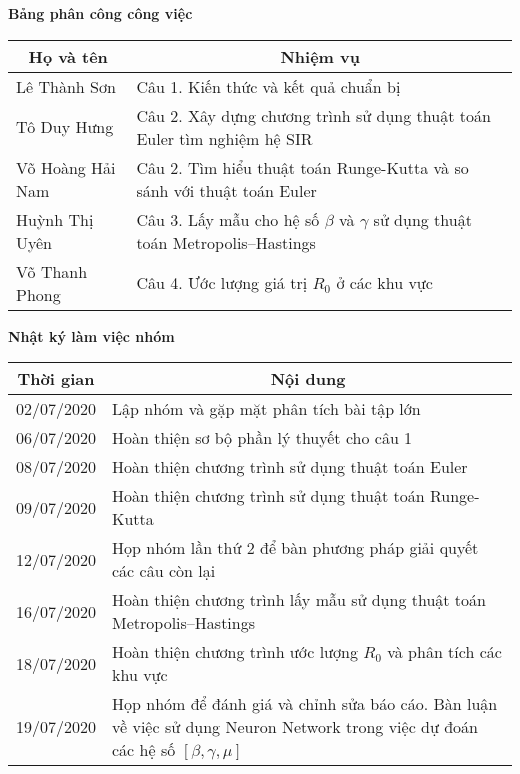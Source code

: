 \documentclass[a4paper]{article}
\begin{document}
\newpage
\textbf{\large Bảng phân công công việc}
\vspace{0.5cm}
\begin{table}[!h]
    \centering
    \begin{tabular}{|p{3cm}|p{10cm}|}
        \hline
        \multicolumn{1}{|c|}{Họ và tên} & \multicolumn{1}{c|}{Nhiệm vụ} \\
         \hline
         Lê Thành Sơn & Câu 1. Kiến thức và kết quả chuẩn bị\\ 
         \hline
         Tô Duy Hưng &  Câu 2. Xây dựng chương trình sử dụng thuật toán Euler tìm nghiệm hệ SIR\\
         \hline
         Võ Hoàng Hải Nam & Câu 2. Tìm hiểu thuật toán Runge-Kutta và so sánh với thuật toán Euler\\
         \hline 
         Huỳnh Thị Uyên & Câu 3. Lấy mẫu cho hệ số $\beta$ và $\gamma$ sử dụng thuật toán Metropolis–Hastings\\
         \hline 
         Võ Thanh Phong & Câu 4. Ước lượng giá trị $R_0$ ở các khu vực\\
         \hline
    \end{tabular}
\end{table}

\vspace{0.5cm}
\textbf{\large Nhật ký làm việc nhóm}
\vspace{0.5cm}
\begin{table}[!h]
    \centering
    \begin{tabular}{|p{3cm}|p{10cm}|}
        \hline
        \multicolumn{1}{|c|}{Thời gian } & \multicolumn{1}{c|}{Nội dung} \\
         \hline
         02/07/2020 & Lập nhóm và gặp mặt phân tích bài tập lớn \\ 
         \hline
         06/07/2020 &  Hoàn thiện sơ bộ phần lý thuyết cho câu 1\\
         \hline
         08/07/2020 & Hoàn thiện chương trình sử dụng thuật toán Euler\\
         \hline 
         09/07/2020 & Hoàn thiện chương trình sử dụng thuật toán Runge-Kutta\\
         \hline 
         12/07/2020 & Họp nhóm lần thứ 2 để bàn phương pháp giải quyết các câu còn lại\\
         \hline
         16/07/2020 & Hoàn thiện chương trình lấy mẫu sử dụng thuật toán Metropolis–Hastings\\
         \hline 
         18/07/2020 & Hoàn thiện chương trình ước lượng $R_0$ và phân tích các khu vực\\
         \hline 
         19/07/2020 & Họp nhóm để đánh giá và chỉnh sửa báo cáo. Bàn luận về việc sử dụng Neuron Network trong việc dự đoán các hệ số $[\beta,\gamma,\mu]$\\
         \hline
    \end{tabular}
\end{table}
\end{document}
